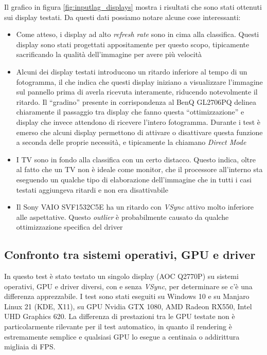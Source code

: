 Il grafico in figura \ref{fig:inputlag_displays} mostra i risultati che sono stati ottenuti sui display testati. Da questi dati possiamo notare alcune cose interessanti:\begin{itemize}
	\item Come atteso, i display ad alto \textit{refresh rate} sono in cima alla classifica. Questi display sono stati progettati appositamente per questo scopo, tipicamente sacrificando la qualità dell'immagine per avere più velocità
	\item Alcuni dei display testati introducono un ritardo inferiore al tempo di un fotogramma, il che indica che questi display iniziano a visualizzare l'immagine sul pannello prima di averla ricevuta interamente, riducendo notevolmente il ritardo. Il ``gradino'' presente in corrispondenza al BenQ GL2706PQ delinea chiaramente il passaggio tra display che fanno questa ``ottimizzazione'' e display che invece attendono di ricevere l'intero fotogramma. Durante i test è emerso che alcuni display permettono di attivare o disattivare questa funzione a seconda delle proprie necessità, e tipicamente la chiamano \textit{Direct Mode}
	\item I TV sono in fondo alla classifica con un certo distacco. Questo indica, oltre al fatto che un TV non è ideale come monitor, che il processore all'interno sta eseguendo un qualche tipo di elaborazione dell'immagine che in tutti i casi testati aggiungeva ritardi e non era disattivabile
	\item Il Sony VAIO SVF1532C5E ha un ritardo con \textit{VSync} attivo molto inferiore alle aspettative. Questo \textit{outlier} è probabilmente causato da qualche ottimizzazione specifica del driver
\end{itemize}

\subsection{Confronto tra sistemi operativi, GPU e driver}
In questo test è stato testato un singolo display (AOC Q2770P) su sistemi operativi, GPU e driver diversi, con e senza \textit{VSync}, per determinare se c'è una differenza apprezzabile. I test sono stati eseguiti su Windows 10 e su Manjaro Linux 21 (KDE, X11), su GPU Nvidia GTX 1080, AMD Radeon RX550, Intel UHD Graphics 620. La differenza di prestazioni tra le GPU testate non è particolarmente rilevante per il test automatico, in quanto il rendering è estremamente semplice e qualsiasi GPU lo esegue a centinaia o addirittura migliaia di FPS.

